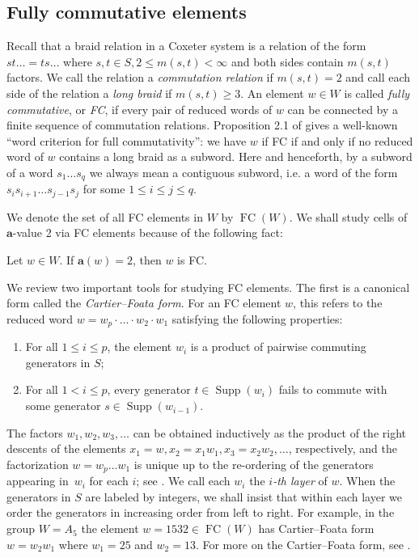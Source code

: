 \documentclass[ALCO,Unicode,published]{cedram}
\newcommand{\la}{\mathbf{a}}
\DeclareMathOperator{\supp}{\mathrm{Supp}}
\DeclareMathOperator{\fc}{\mathrm{FC}}
\begin{document}
\subsection{Fully commutative elements}
\label{sec:FC}

Recall that a braid relation in a Coxeter system is a relation of the form $st\dots =ts\dots$ where
$s,t\in S, 2\le m(s,t)<\infty$ and both sides contain $m(s,t)$ factors. We call the relation a
\emph{commutation relation} if $m(s,t)=2$ and call each side of the relation a \emph{long braid} if
$m(s,t)\ge 3$. An element $w\in W$ is called \emph{fully commutative}, or \emph{FC}, if every pair
of reduced words of $w$ can be connected by a finite sequence of commutation relations. Proposition
2.1 of \cite{FC} gives a well-known ``word criterion for full commutativity'': we have $w$ if FC if
and only if no reduced word of $w$ contains a long braid as a subword. Here and henceforth, by a
subword of a word $s_1\dots s_q$ we always mean a contiguous subword, i.e. a word of the form
$s_is_{i+1}\dots s_{j-1}s_{j}$ for some $1\le i\le j\le q$.

We denote the set of all FC elements in $W$ by $\fc(W)$. We shall study cells of $\la$-value 2 via
FC elements because of the following fact:

\begin{prop} \label{prop:a2impliesFC} 
    Let $w\in W$. If $\la(w)=2$, then $w$ is FC.  
\end{prop} 
 
We review two important tools for studying FC elements.  The first is a canonical form called the
\emph{Cartier--Foata form}. For an FC element $w$, this refers to the reduced word $w=w_p\cdot \dots
\cdot w_2\cdot w_1$ satisfying the following properties:
\begin{enumerate}
    \item  For all $1\le i\le p$, the element $w_i$ is a product of pairwise commuting generators in
         $S$;
    \item For all $1<i\le p$, every generator $t\in \supp(w_i)$ fails to commute with some generator
         $s\in \supp(w_{i-1})$.
\end{enumerate} 
The factors $w_1,w_2,w_3,\ldots$ can be obtained inductively as the product of the right descents of
the elements $x_1=w, x_2=x_1w_1, x_3=x_2w_2, \ldots $, respectively, and the factorization $w=w_p\dots w_1$
is unique up to the re-ordering of the generators appearing in~$w_i$ for each $i$; see
\cite{GreenStarReducible}.  We call each $w_i$ the \emph{$i$-th layer} of $w$. When the generators
in $S$ are labeled by integers, we shall insist that within each layer we order the generators in
increasing order from left to right. For example, in the group $W=A_5$ the element $w=1532\in
\fc(W)$ has Cartier--Foata form $w=w_2w_1$ where $w_1=25$ and $w_2=13$.  For more on the
Cartier--Foata form, see \cite{GreenStarReducible}.
\end{document}
